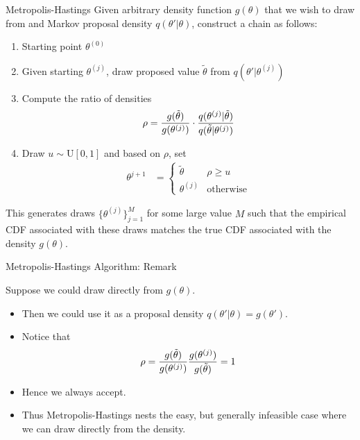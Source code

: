 \documentclass[aspectratio=169, handout]{beamer}
\begin{document}
{\footnotesize
\begin{frame}{Metropolis-Hastings}
Given arbitrary density function $g(\theta)$ that we wish to draw from
and Markov proposal density $q(\theta'|\theta)$, construct a chain
as follows:
\begin{enumerate}
  \item Starting point $\theta^{(0)}$
  \item Given starting $\theta^{(j)}$, draw proposed value
    $\tilde{\theta}$ from $q(\theta'|\theta^{(j)})$
  \item Compute the ratio of densities
    \begin{align*}
      \rho =
      \frac{%
        g(\tilde{\theta})
      }{%
        g({\theta}^{(j)})
      }
      \cdot
      \frac{%
        q(\theta^{(j)}|\tilde{\theta})
      }{%
        q(\tilde{\theta}|\theta^{(j)})
      }
    \end{align*}
  \item Draw $u\sim \text{U}[0,1]$ and based on $\rho$, set
    \begin{align*}
      \theta^{j+1}
      &=
      \begin{cases}
        \tilde{\theta} & \rho \geq u \\
        \theta^{(j)} & \text{otherwise}
      \end{cases}
    \end{align*}
\end{enumerate}
This generates draws $\{\theta^{(j)}\}_{j=1}^M$ for some large value $M$
such that the empirical CDF associated with these draws matches the true
CDF associated with the density $g(\theta)$.
\end{frame}
}

{\footnotesize
\begin{frame}{Metropolis-Hastings Algorithm: Remark}

Suppose we could draw directly from $g(\theta)$.
\begin{itemize}
  \item Then we could use it as a proposal density
    $q(\theta'|\theta)=g(\theta')$.

  \item Notice that
    \begin{align*}
      \rho =
      \frac{%
        g(\tilde{\theta})
      }{%
        g({\theta}^{(j)})
      }
      \frac{%
        g(\theta^{(j)})
      }{%
        g(\tilde{\theta})
      }
      =
      1
    \end{align*}

  \item Hence we always accept.

  \item Thus Metropolis-Hastings nests the easy, but generally
    infeasible case where we can draw directly from the density.
\end{itemize}
\end{frame}
}
\end{document}
